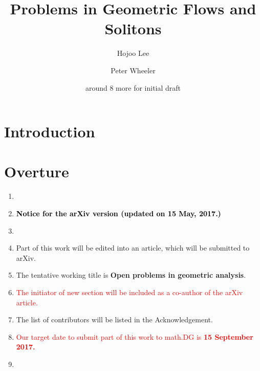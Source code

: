\documentclass{amsart}
\title[Problems in Geometric Flows and Solitons]{Problems in Geometric Flows and Solitons}
\author[]{Hojoo Lee}
\author[]{Peter Wheeler}
\author[]{around 8 more for initial draft}
\theoremstyle{definition}
\begin{document}
\maketitle
\tableofcontents

\section{Introduction}
\label{sec:intro}
 
 \newpage
 
\section{Overture} 

\begin{enumerate}
\item[]
\item[] \textbf{\textcolor{black}{Notice for the arXiv version (updated on 15 May, 2017.)}}
\item[]
\item Part of this work will be edited into an article, which will be submitted to arXiv.
\item The tentative working title is \textbf{Open problems in geometric analysis}. 
\item {\textcolor{red}{The initiator of new section will be included as a co-author of the arXiv article.}} 
\item The list of contributors will be listed in the Acknowledgement.
\item {\textcolor{red}{Our target date to submit part of this work to math.DG is  \textbf{15 September 2017.}}} 
\item[]
\end{enumerate}
\end{document}
